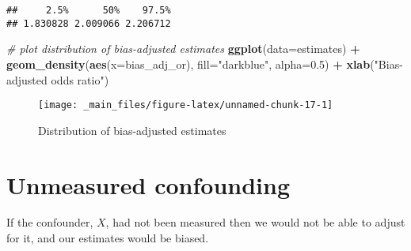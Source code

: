 \documentclass[
]{book}
\newenvironment{Shaded}{\begin{snugshade}}{\end{snugshade}}
\newcommand{\AttributeTok}[1]{\textcolor[rgb]{0.13,0.29,0.53}{#1}}
\newcommand{\CommentTok}[1]{\textcolor[rgb]{0.56,0.35,0.01}{\textit{#1}}}
\newcommand{\FloatTok}[1]{\textcolor[rgb]{0.00,0.00,0.81}{#1}}
\newcommand{\FunctionTok}[1]{\textcolor[rgb]{0.13,0.29,0.53}{\textbf{#1}}}
\newcommand{\NormalTok}[1]{#1}
\newcommand{\SpecialCharTok}[1]{\textcolor[rgb]{0.81,0.36,0.00}{\textbf{#1}}}
\newcommand{\StringTok}[1]{\textcolor[rgb]{0.31,0.60,0.02}{#1}}
\begin{document}
\begin{verbatim}
##     2.5%      50%    97.5% 
## 1.830828 2.009066 2.206712
\end{verbatim}

\begin{Shaded}
\begin{Highlighting}[]
\CommentTok{\# plot distribution of bias{-}adjusted estimates}
\FunctionTok{ggplot}\NormalTok{(}\AttributeTok{data=}\NormalTok{estimates) }\SpecialCharTok{+} 
  \FunctionTok{geom\_density}\NormalTok{(}\FunctionTok{aes}\NormalTok{(}\AttributeTok{x=}\NormalTok{bias\_adj\_or), }\AttributeTok{fill=}\StringTok{"darkblue"}\NormalTok{, }\AttributeTok{alpha=}\FloatTok{0.5}\NormalTok{) }\SpecialCharTok{+}
  \FunctionTok{xlab}\NormalTok{(}\StringTok{"Bias{-}adjusted odds ratio"}\NormalTok{)}
\end{Highlighting}
\end{Shaded}

\begin{figure}

{\centering \texttt{[image: \_main\_files/figure-latex/unnamed-chunk-17-1]} 

}

\caption{Distribution of bias-adjusted estimates}\label{fig:unnamed-chunk-17}
\end{figure}

\hypertarget{unmeasured-confounding}{%
\section{Unmeasured confounding}\label{unmeasured-confounding}}

If the confounder, \(X\), had not been measured then we would not be able to adjust for it, and our estimates would be biased.
\end{document}
